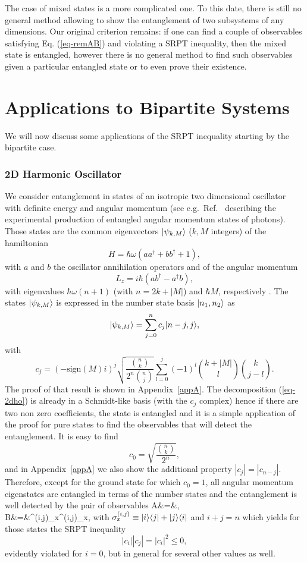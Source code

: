 The case of mixed states is a more complicated one. To this date, there is still no general method allowing to show the entanglement of two subsystems of any dimensions. Our original criterion remains: if one can find a couple of observables satisfying Eq. (\ref{eq-remAB}) and violating a SRPT inequality, then the mixed state is entangled, however there is no general method to find such observables given a particular entangled state or to even prove their existence.

\section{Applications to Bipartite Systems}  \label{sec-SPRTbip}

We will now discuss some applications of the SRPT inequality starting by the bipartite case.

\subsubsection{2D Harmonic Oscillator}

We consider entanglement in states of an isotropic two dimensional oscillator with definite energy and angular momentum (see e.g.~Ref.~\cite{Mai01} describing the experimental production of entangled angular momentum states of photons). Those states are the common eigenvectors $| \psi_{k,M} \rangle$ ($k, M$ integers) of the hamiltonian
\[ H=\hbar \omega(a a^\dagger + b b^\dagger +1),\]
with $a$ and $b$ the oscillator annihilation operators and of the angular momentum
\[ L_z = i \hbar (a b^\dagger - a^\dagger b),\]
with eigenvalues $\hbar \omega(n+1)$ (with $n=2k + |M|$) and $\hbar M$, respectively . The states $| \psi_{k,M} \rangle$ is expressed in the number state basis $| n_1,n_2 \rangle$ as
\[ | \psi_{k,M} \rangle = \sum_{j=0}^{n}c_j | n-j,j \rangle,\label{eq-2dho}\]
with
\[ c_j =  \left(- \textrm{sign}(M) i \right)^j  \sqrt{\frac{\binom{n}{k} }{2^n \binom{n}{j}}}    \sum_{l=0}^{j}(-1)^l \binom{k+|M|}{l} \binom{k}{j-l} . \]
The proof of that result is shown in Appendix~\ref{appA}. The decomposition (\ref{eq-2dho}) is already in a Schmidt-like basis (with the $c_j$ complex) hence if there are two non zero coefficients, the state is entangled and it is a simple application of the proof for pure states to find the observables that will detect the entanglement. It is easy to find
\[ c_0 = \sqrt{\frac{\binom{n}{k} }{2^n}}, \]
and in Appendix~\ref{appA} we also show the additional property $|c_j|=|c_{n-j}|$. Therefore, except for the ground state for which $c_0=1$, all angular momentum eigenstates are entangled in terms of the number states and the entanglement is well detected by the pair of observables
\bea
A&=&, \\  B&=&\sigma^{(i,j)}_x\otimes\sigma^{(i,j)}_x, \label{eq-AB2D}
\eea
with $\sigma_x^{(i,j)} \equiv | i \rangle \langle j | +| j \rangle \langle i |$ and $i+j =n$ which yields for those states the SRPT inequality
\[ |c_i||c_j|=|c_i|^2 \le 0 ,\]
evidently violated for $i=0$, but in general for several other values as well.

